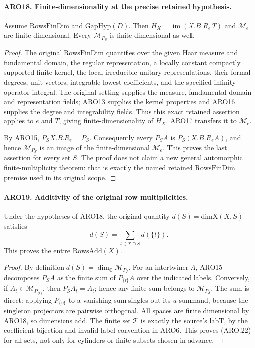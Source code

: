 \documentclass[11pt,a4paper]{article}
\numberwithin{equation}{section}
\theoremstyle{remark}\newtheorem{remark}[theorem]{Remark}
\begin{document}
\paragraph{ARO18. Finite-dimensionality at the precise retained hypothesis.}
\label{claim:ARO18}
Assume \(\mathrm{RowsFinDim}\) and \(\mathrm{GapHyp}(D)\).
Then \(H_X=\operatorname{im}(X.B.R_e\,T)\) and
\(\mathcal M_e\) are finite dimensional.  Every
\(\mathcal M_{P_S}\) is finite dimensional as well.
\begin{proof}
The original \(\mathrm{RowsFinDim}\) quantifies over the given
Haar measure and fundamental domain, the regular representation,
a locally constant compactly supported finite kernel, the local
irreducible unitary representations, their formal degrees, unit
vectors, integrable lowest coefficients, and the specified infinity
operator integral.  The original setting supplies the measure,
fundamental-domain and representation fields; ARO13 supplies the
kernel properties and ARO16 supplies the degree and integrability
fields.  Thus this exact retained assertion applies to \(e\) and
\(T\), giving finite-dimensionality of \(H_X\).
ARO17 transfers it to \(\mathcal M_e\).

By ARO15, \(P_SX.B.R_e=P_S\).  Consequently every
\(P_S A\) is \(P_S(X.B.R_eA)\), and hence
\(\mathcal M_{P_S}\) is an image of the finite-dimensional
\(\mathcal M_e\).  This proves the last assertion for every set
\(S\).  The proof does not claim a new general automorphic
finite-multiplicity theorem: that is exactly the named retained
\(\mathrm{RowsFinDim}\) premise used in its original scope.
\end{proof}

\paragraph{ARO19. Additivity of the original row multiplicities.}
\label{claim:ARO19}
Under the hypotheses of ARO18, the original quantity
\(d(S)=\mathrm{dimX}(X,S)\) satisfies
\[
                  d(S)=\sum_{t\in\mathcal T\cap S}d(\{t\}).
 \tag{ARO.22}
\]
This proves the entire \(\mathrm{RowsAdd}(X)\).
\begin{proof}
By definition \(d(S)=\dim_{\mathbb C}\mathcal M_{P_S}\).
For an intertwiner \(A\), ARO15 decomposes \(P_SA\) as the
finite sum of \(P_{\{t\}}A\) over the indicated labels.  Conversely,
if \(A_t\in\mathcal M_{P_{\{t\}}}\), then
\(P_S A_t=A_t\); hence any finite sum belongs to
\(\mathcal M_{P_S}\).  The sum is direct: applying
\(P_{\{u\}}\) to a vanishing sum singles out its \(u\)-summand,
because the singleton projectors are pairwise orthogonal.
All spaces are finite dimensional by ARO18, so dimensions add.
The finite set \(\mathcal T\) is exactly the source's
\(\mathrm{labT}\), by the coefficient bijection and invalid-label
convention in ARO6.  This proves (ARO.22) for all sets, not only
for cylinders or finite subsets chosen in advance.
\end{proof}
\end{document}

